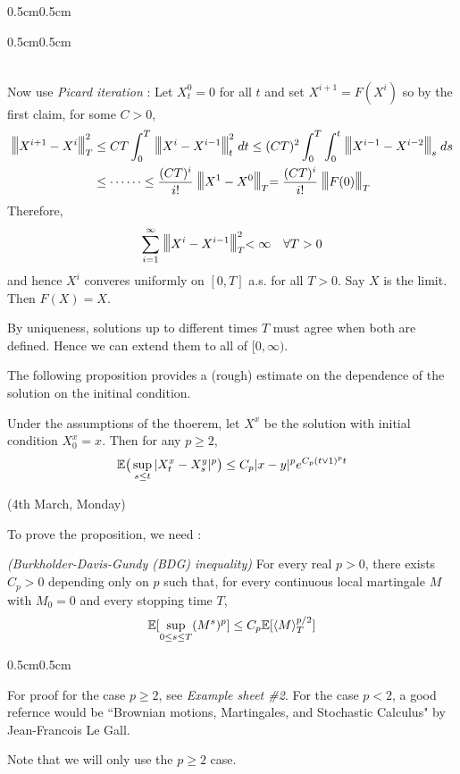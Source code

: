 \documentclass[10pt,a4paper]{article}
\newenvironment{proof}
{\begin{changemargin}{0.5cm}{0.5cm} 
	}%
	{\end{changemargin}
}
\newenvironment{subproof}
{\begin{changemargin}{0.5cm}{0.5cm} 
	}%
	{\end{changemargin}
}
\newenvironment{p}
{\begin{proof} 
	}%
	{\end{proof}
}
\begin{document}
\begin{p}
\begin{subproof}
\begin{align*}
\end{align*}
\end{subproof}
Now use \emph{Picard iteration} : Let $X_t^0 = 0$ for all $t$ and set $X^{i+1} = F(X^i)$ so by the first claim, for some $C>0$,
\begin{align*}
\tnorms{X^{i+1} - X^i}{T}^2 &\leq CT \int_0^T \tnorms{X^{i} - X^{i-1}}{t}^2 dt \leq (CT)^2 \int_0^T \int_0^t \tnorms{X^{i-1} - X^{i-2}}{s} ds \\
&\leq \cdots\cdots \leq \frac{(CT)^i}{i!} \tnorms{X^1 - X^0}{T} = \frac{(CT)^i}{i!} \tnorms{F(0)}{T} 
\end{align*}
Therefore,
\begin{align*}
\sum_{i=1}^{\infty} \tnorms{X^i - X^{i-1}}{T}^2 < \infty \quad \forall T>0
\end{align*}
and hence $X^i$ converes uniformly on $[0, T]$ a.s. for all $T>0$. Say $X$ is the limit. Then $F(X)=X$.
\s

By uniqueness, solutions up to different times $T$ must agree when both are defined. Hence we can extend them to all of $[0, \infty)$. 

\eop
\end{p}
\s

The following proposition provides a (rough) estimate on the dependence of the solution on the initinal condition.
\s

\prop Under the assumptions of the thoerem, let $X^{x}$ be the solution with initial condition $X_0^x =x$. Then for any $p\geq 2$,
\begin{align*}
\mathbb{E} \big( \sup_{s\leq t} |X_t^x - X_s^y|^p \big) \leq C_p |x-y|^p e^{C_p (t\vee 1)^p t}
\end{align*}

\newday

(4th March, Monday)
\s

To prove the proposition, we need :
\s

\lem \emph{(Burkholder-Davis-Gundy (BDG) inequality)} For every real $p>0$, there exists $C_p>0$ depending only on $p$ such that, for every continuous local martingale $M$ with $M_0 =0$ and every stopping time $T$,
\begin{align*}
\mathbb{E} [\sup_{0\leq s\leq T}(M^s)^p] \leq C_p \mathbb{E} [ \langle M \rangle_T^{p/2}]
\end{align*}
\begin{p}
For proof for the case $p\geq 2$, see \emph{Example sheet \#2}. For the case $p< 2$, a good refernce would be ``Brownian motions, Martingales, and Stochastic Calculus" by Jean-Francois Le Gall.

\quad Note that we will only use the $p\geq 2$ case.
\end{p}
\s
\end{document}
